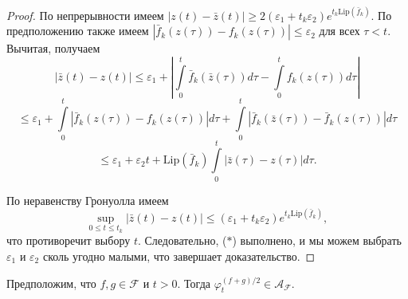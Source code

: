 \documentclass[../NDCNNAI_main.tex]{subfiles}
\begin{document}
\begin{proof}
По непрерывности имеем \(|z(t) - \bar{z}(t)| \geq 2(\varepsilon_1 + t_k \varepsilon_2) e^{t_k \mathrm{Lip}(\bar{f}_k)}\). По предположению также имеем \(|\bar{f}_k(z(\tau)) - f_k(z(\tau))| \leq \varepsilon_2\) для всех \(\tau < t\). Вычитая, получаем
\[
|\bar{z}(t) - z(t)| \leq \varepsilon_1 + \left| \int\limits_{0}^{t} \bar{f}_k(\bar{z}(\tau)) d\tau - \int\limits_{0}^{t} f_k(z(\tau)) d\tau \right|
\]
\[
\leq \varepsilon_1 + \int\limits_{0}^{t} |\bar{f}_k(z(\tau)) - f_k(z(\tau))| d\tau + \int\limits_{0}^{t} |\bar{f}_k(\bar{z}(\tau)) - \bar{f}_k(z(\tau))| d\tau
\]
\[
\leq \varepsilon_1 + \varepsilon_2 t + \mathrm{Lip}(\bar{f}_k) \int\limits_{0}^{t} |\bar{z}(\tau) - z(\tau)| d\tau.
\]

По неравенству Гронуолла имеем
\[
\sup_{0 \leq t \leq t_k} |\bar{z}(t) - z(t)| \leq (\varepsilon_1 + t_k \varepsilon_2) e^{t_k \mathrm{Lip}(\bar{f}_k)},
\]
что противоречит выбору \(t\). Следовательно, ($\ast$) выполнено, и мы можем выбрать \(\varepsilon_1\) и \(\varepsilon_2\) сколь угодно малыми, что завершает доказательство.
\end{proof}

\begin{lemma}\label{lemma:3.13}
Предположим, что \(f, g \in \mathcal{F}\) и \(t > 0\). Тогда \(\varphi_t^{(f+g)/2} \in \mathcal{A}_{\mathcal{F}}\).
\end{lemma}
\end{document}
